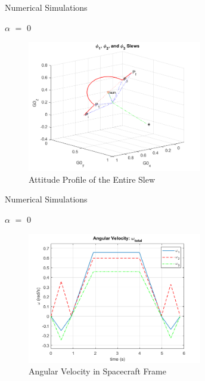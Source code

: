 \documentclass{beamer}
\begin{document}
\begin{frame}{Numerical Simulations}
	\begin{block}{$\alpha$ $=$ 0}
		
		\begin{figure}[H]
			\label{fig:phi1_phi2_phi3_alpha0}
			\includegraphics[width=3in]{figures/alpha0/phi1_phi2_phi3.png}
			\caption{Attitude Profile of the Entire Slew}
		\end{figure}
		
	\end{block}
\end{frame}
\begin{frame}{Numerical Simulations}
	\begin{block}{$\alpha$ $=$ 0}
		
		
		\begin{figure}[H]
			\label{fig:ang_vel_phi_total_alpha0}
			\begin{center}
				\includegraphics[width=3in]{figures/alpha0/ang_vel.png}
			\end{center}
			\caption{Angular Velocity in Spacecraft Frame}
		\end{figure}
		
	\end{block}
\end{frame}
\end{document}
